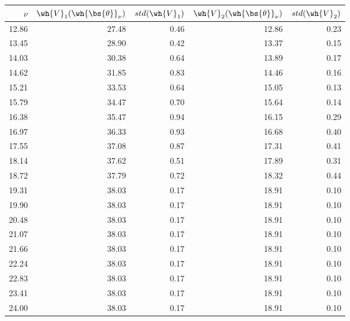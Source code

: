 \begin{tabular}{rrrrr}\hline 
$\nu$  & $\wh{V}_1(\wh{\bs{\theta}}_{\nu})$ & $std(\wh{V}_1)$ & $\wh{V}_2(\wh{\bs{\theta}}_{\nu})$ & $std(\wh{V}_2)$ \\ \hline 
   12.86 &    27.48 &     0.46  &    12.86 &      0.23  \\ 
   13.45 &    28.90 &     0.42  &    13.37 &      0.15  \\ 
   14.03 &    30.38 &     0.64  &    13.89 &      0.17  \\ 
   14.62 &    31.85 &     0.83  &    14.46 &      0.16  \\ 
   15.21 &    33.53 &     0.64  &    15.05 &      0.13  \\ 
   15.79 &    34.47 &     0.70  &    15.64 &      0.14  \\ 
   16.38 &    35.47 &     0.94  &    16.15 &      0.29  \\ 
   16.97 &    36.33 &     0.93  &    16.68 &      0.40  \\ 
   17.55 &    37.08 &     0.87  &    17.31 &      0.41  \\ 
   18.14 &    37.62 &     0.51  &    17.89 &      0.31  \\ 
   18.72 &    37.79 &     0.72  &    18.32 &      0.44  \\ 
   19.31 &    38.03 &     0.17  &    18.91 &      0.10  \\ 
   19.90 &    38.03 &     0.17  &    18.91 &      0.10  \\ 
   20.48 &    38.03 &     0.17  &    18.91 &      0.10  \\ 
   21.07 &    38.03 &     0.17  &    18.91 &      0.10  \\ 
   21.66 &    38.03 &     0.17  &    18.91 &      0.10  \\ 
   22.24 &    38.03 &     0.17  &    18.91 &      0.10  \\ 
   22.83 &    38.03 &     0.17  &    18.91 &      0.10  \\ 
   23.41 &    38.03 &     0.17  &    18.91 &      0.10  \\ 
   24.00 &    38.03 &     0.17  &    18.91 &      0.10  \\ \hline 
\end{tabular}
